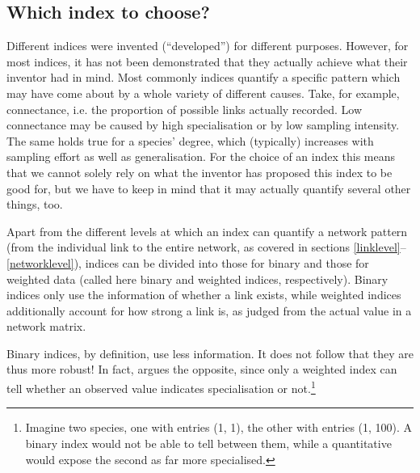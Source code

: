 \documentclass[a4paper, 11pt]{article}\usepackage[]{graphicx}\usepackage[]{color}
\renewcommand{\vec}[1]{\mathbf{#1}}                   %
\begin{document}
\subsection{Which index to choose?}%
Different indices were invented (``developed'') for different purposes. However, for most indices, it has not been demonstrated that they actually achieve what their inventor had in mind. Most commonly indices quantify a specific pattern which may have come about by a whole variety of different causes. Take, for example, connectance, i.e. the proportion of possible links actually recorded. Low connectance may be caused by high specialisation or by low sampling intensity. The same holds true for a species' degree, which (typically) increases with sampling effort as well as generalisation. For the choice of an index this means that we cannot solely rely on what the inventor has proposed this index to be good for, but we have to keep in mind that it may actually quantify several other things, too.

Apart from the different levels at which an index can quantify a network pattern (from the individual link to the entire network, as covered in sections \ref{linklevel}--\ref{networklevel}), indices can be divided into those for binary and those for weighted data (called here binary and weighted indices, respectively). Binary indices only use the information of whether a link exists, while weighted indices additionally account for how strong a link is, as judged from the actual value in a network matrix.%

Binary indices, by definition, use less information. It does not follow that they are thus more robust! In fact, \citet{Bluthgen2010} argues the opposite, since only a weighted index can tell whether an observed value indicates specialisation or not.\footnote{Imagine two species, one with entries (1, 1), the other with entries (1, 100). A binary index would not be able to tell between them, while a quantitative would expose the second as far more specialised.} 
\end{document}

